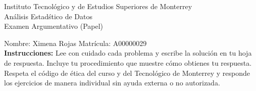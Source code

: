 \documentclass[10pt]{report}
\begin{document}
\newpage



\begin{center}
{\large Instituto Tecnol\'{o}gico y de Estudios Superiores de Monterrey \\
An\'alisis Estad\'stico de Datos } \\
Examen Argumentativo (Papel)
\end{center}

Nombre: \underline{\hspace*{.2in}}
Ximena Rojas
\underline{\hspace*{.2in}} \quad Matr\'icula:\underline{\hspace*{.2in}}
A00000029
\underline{\hspace*{.2in}} \\

{\bf Instrucciones:} Lee con cuidado cada problema y escribe la soluci\'on
en tu hoja de respuesta. Incluye tu procedimiento que muestre c\'omo obtienes tu respuesta.  Respeta el c\'odigo de \'etica del curso y del Tecnol\'ogico de Monterrey y responde los ejercicios de manera individual sin ayuda externa o no autorizada.
\end{document}
